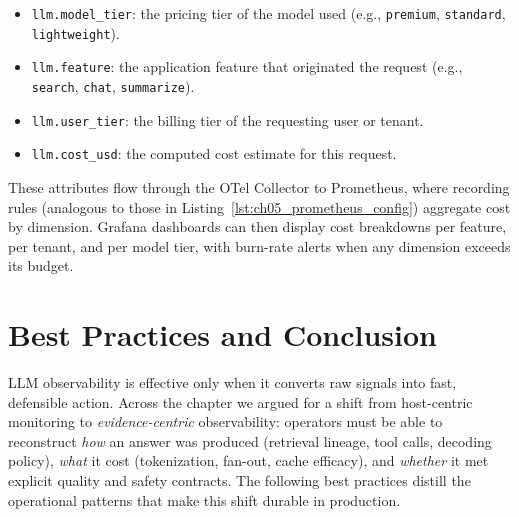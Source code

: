 \begin{itemize}
    \item \texttt{llm.model\_tier}: the pricing tier of the model used (e.g., \texttt{premium}, \texttt{standard}, \texttt{lightweight}).
    \item \texttt{llm.feature}: the application feature that originated the request (e.g., \texttt{search}, \texttt{chat}, \texttt{summarize}).
    \item \texttt{llm.user\_tier}: the billing tier of the requesting user or tenant.
    \item \texttt{llm.cost\_usd}: the computed cost estimate for this request.
\end{itemize}

These attributes flow through the OTel Collector to Prometheus, where recording rules (analogous to those in Listing~\ref{lst:ch05_prometheus_config}) aggregate cost by dimension. Grafana dashboards can then display cost breakdowns per feature, per tenant, and per model tier, with burn-rate alerts when any dimension exceeds its budget.


\section{Best Practices and Conclusion}
\label{sec:best-practices-and-conclusion}
LLM observability is effective only when it converts raw signals into fast, defensible action. Across the chapter we argued for a shift from host-centric monitoring to \emph{evidence-centric} observability: operators must be able to reconstruct \emph{how} an answer was produced (retrieval lineage, tool calls, decoding policy), \emph{what} it cost (tokenization, fan-out, cache efficacy), and \emph{whether} it met explicit quality and safety contracts. The following best practices distill the operational patterns that make this shift durable in production.

